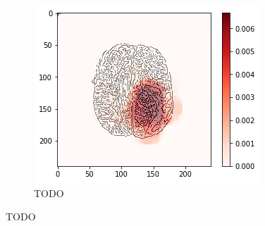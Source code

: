 \begin{figure}[H]
\begin{subfigure}{.33\textwidth}
        \centering
        \includegraphics[width=\linewidth]{chapters/06_hdm/circle20/18.png}
        \caption{TODO}
    \end{subfigure}
    \caption{TODO}
\end{figure}

